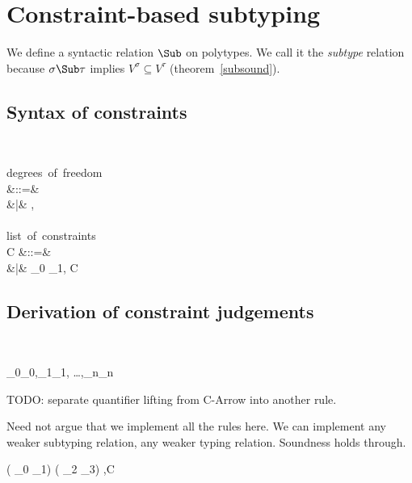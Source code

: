 \documentclass{amsart}
\theoremstyle{definition}
\begin{document}
\section{Constraint-based subtyping}

We define a syntactic relation $\Sub$ on polytypes. We call it
the \emph{subtype} relation because $\sigma \Sub \tau$ implies
$V^\sigma \subseteq V^\tau$ (theorem~\ref{subsound}).

\subsection{Syntax of constraints}~

\begin{syntax}
\mbox{degrees of freedom}\\
\Delta
&::=& \emptyset \\
&|& \alpha,\Delta
\\
\\
\mbox{list of constraints}\\
C
&::=& \emptyset \\
&|& \rho_0 \Sub \rho_1, C
\end{syntax}

\subsection{Derivation of constraint judgements}~

\infrule[C-Refl]
{}
{\Delta \vdash \rho_0\Sub\rho_0,\rho_1\Sub\rho_1,
\ldots,\rho_n\Sub\rho_n}

TODO: separate quantifier lifting from {\sc C-Arrow} into another rule.

Need not argue that we implement all the rules here.
We can implement any weaker subtyping relation, any weaker typing
relation. Soundness holds through.

{\Delta\vdash
(\All{\bar\alpha} \Ex{\bar\beta} \theta_0 \R \theta_1)
\Sub
(\All{\bar\gamma} \Ex{\bar\delta} \theta_2 \R \theta_3)
,C}
\end{document}
